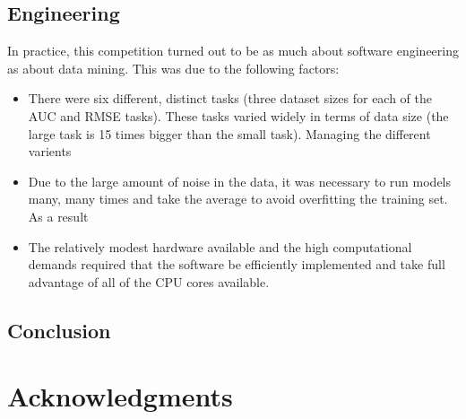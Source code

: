 \documentclass{article}
\begin{document}
\subsection{Engineering}

In practice, this competition turned out to be as much about software
engineering as about data mining.  This was due to the following factors:
\begin{itemize}
\item There were six different, distinct tasks (three dataset sizes for each of the AUC and RMSE tasks).  These tasks varied widely in terms of data size (the large task is 15 times bigger than the small task).  Managing the different varients
\item Due to the large amount of noise in the data, it was necessary to run models many, many times and take the average to avoid overfitting the training set.  As a result
\item The relatively modest hardware available and the high computational demands required that the software be efficiently implemented and take full advantage of all of the CPU cores available.
\end{itemize}

\subsection{Conclusion}


\section*{Acknowledgments} 
 


\end{document}
